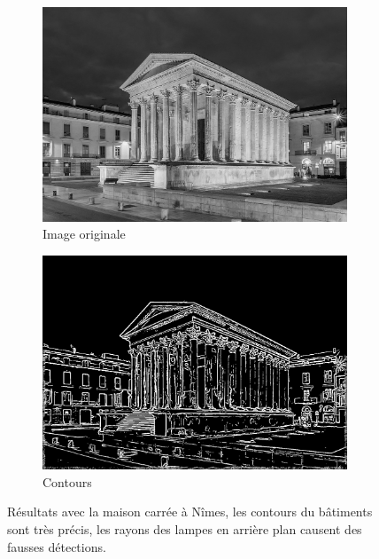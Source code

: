 \documentclass[hidelinks,11pt]{article}
\theoremstyle{mytheoremstyle}
\theoremstyle{mytheoremstyle}
\theoremstyle{myproblemstyle}
\begin{document}
    \begin{figure}[h]
        \centering
        \begin{subfigure}[b]{0.4\textwidth}
            \centering
            \includegraphics[width=\textwidth]{figs/fig8a}
            \caption{Image originale}
        \end{subfigure}
        \hfill
        \begin{subfigure}[b]{0.4\textwidth}
            \centering
            \includegraphics[width=\textwidth]{figs/fig8b}
            \caption{Contours}
        \end{subfigure}
           \caption{Résultats avec la maison carrée à Nîmes, les contours du bâtiments sont très précis, les rayons des lampes en arrière plan causent des fausses détections. }
    \end{figure}
\end{document}
